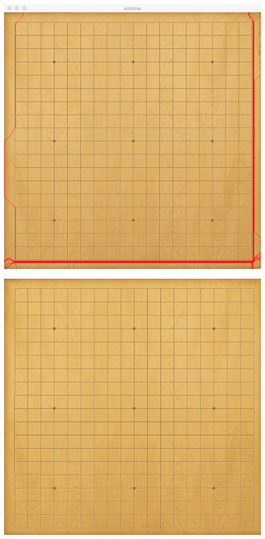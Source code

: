 \documentclass[10pt, a4paper]{article}
\begin{document}
    \includegraphics[scale = .1]{2lapseam.png}

    \includegraphics[scale = .3]{2lap.jpg}
\end{document}
